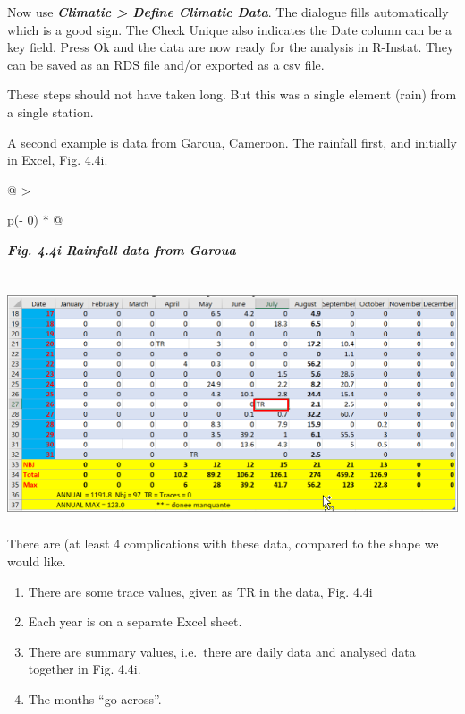 \documentclass[
  letterpaper,
  DIV=11,
  numbers=noendperiod]{scrreprt}
\begin{document}
Now use \textbf{\emph{Climatic \textgreater{} Define Climatic Data}}.
The dialogue fills automatically which is a good sign. The Check Unique
also indicates the Date column can be a key field. Press Ok and the data
are now ready for the analysis in R-Instat. They can be saved as an RDS
file and/or exported as a csv file.

These steps should not have taken long. But this was a single element
(rain) from a single station.

A second example is data from Garoua, Cameroon. The rainfall first, and
initially in Excel, Fig. 4.4i.

\begin{longtable}[]{@{}
  >{\raggedright\arraybackslash}p{(\columnwidth - 0\tabcolsep) * }@{}}
\toprule\noalign{}
\begin{minipage}[b]{\linewidth}\raggedright
\textbf{\emph{Fig. 4.4i Rainfall data from Garoua}}
\end{minipage} \\
\midrule\noalign{}
\endhead
\bottomrule\noalign{}
\endlastfoot
\includegraphics[width=5.61702in,height=2.67347in]{figures/Fig4.4i.png} \\
\end{longtable}

There are (at least 4 complications with these data, compared to the
shape we would like.

\begin{enumerate}
\def\labelenumi{\arabic{enumi}.}
\item
  There are some trace values, given as TR in the data, Fig. 4.4i
\item
  Each year is on a separate Excel sheet.
\item
  There are summary values, i.e.~there are daily data and analysed data
  together in Fig. 4.4i.
\item
  The months ``go across''.
\end{enumerate}
\end{document}
